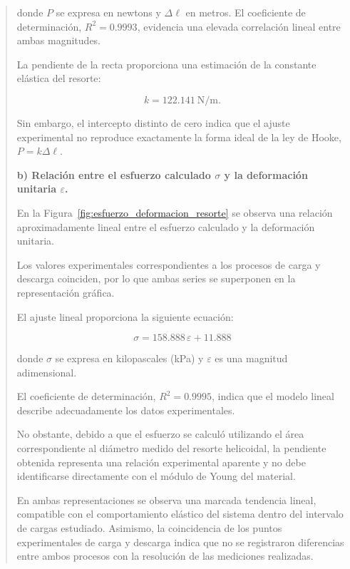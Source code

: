 \documentclass[11pt,a4paper]{article}
\begin{document}
\begin{quote}
\noindent
donde $P$ se expresa en newtons y $\Delta\ell$ en metros.
El coeficiente de determinación, $R^2 = 0.9993$, evidencia
una elevada correlación lineal entre ambas magnitudes.

La pendiente de la recta proporciona una estimación de
la constante elástica del resorte:

\begin{equation}
    k = 122.141\ \mathrm{N/m}.
\end{equation}

Sin embargo, el intercepto distinto de cero indica que
el ajuste experimental no reproduce exactamente la forma
ideal de la ley de Hooke, $P = k\Delta\ell$.

\medskip

\noindent\textbf{b) Relación entre el esfuerzo calculado
$\sigma$ y la deformación unitaria $\varepsilon$.}

En la Figura~\ref{fig:esfuerzo_deformacion_resorte} se
observa una relación aproximadamente lineal entre el
esfuerzo calculado y la deformación unitaria.

Los valores experimentales correspondientes a los procesos
de carga y descarga coinciden, por lo que ambas series
se superponen en la representación gráfica.

El ajuste lineal proporciona la siguiente ecuación:

\begin{equation}
    \boxed{\sigma = 158.888\,\varepsilon + 11.888}
\end{equation}

\noindent
donde $\sigma$ se expresa en kilopascales (kPa) y
$\varepsilon$ es una magnitud adimensional.

El coeficiente de determinación, $R^2 = 0.9995$,
indica que el modelo lineal describe adecuadamente
los datos experimentales.

No obstante, debido a que el esfuerzo se calculó
utilizando el área correspondiente al diámetro medido
del resorte helicoidal, la pendiente obtenida representa
una relación experimental aparente y no debe
identificarse directamente con el módulo de Young
del material.

En ambas representaciones se observa una marcada
tendencia lineal, compatible con el comportamiento
elástico del sistema dentro del intervalo de cargas
estudiado. Asimismo, la coincidencia de los puntos
experimentales de carga y descarga indica que no se
registraron diferencias entre ambos procesos con
la resolución de las mediciones realizadas.



\end{quote}
\end{document}
